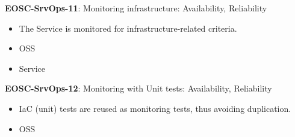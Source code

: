 \textbf{EOSC-SrvOps-11}: Monitoring infrastructure: Availability, Reliability

\begin{itemize}
    \item The Service is monitored for infrastructure-related criteria. \cite{orviz_fernandez_eosc-synergy_2020}
    \item OSS
    \item Service
\end{itemize}

\textbf{EOSC-SrvOps-12}: Monitoring with Unit tests: Availability, Reliability

\begin{itemize}
    \item IaC (unit) tests are reused as monitoring tests, thus avoiding duplication. \cite{orviz_fernandez_eosc-synergy_2020}
    \item OSS
\end{itemize}

